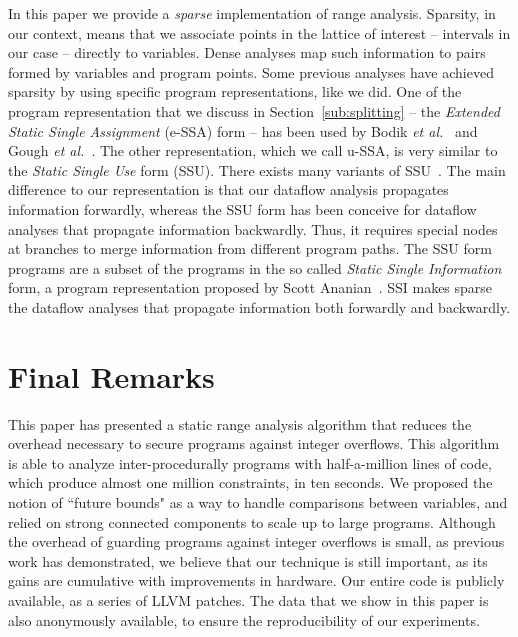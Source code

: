 \documentclass[preprint]{sigplanconf}[10pt]
\begin{document}
In this paper we provide a {\em sparse} implementation of range analysis.
Sparsity, in our context, means that we associate points in the lattice of
interest -- intervals in our case -- directly to variables.
Dense analyses map such information to pairs formed by variables and program
points.
Some previous analyses have achieved sparsity by using specific program
representations, like we did.
One of the program representation that we discuss in
Section~\ref{sub:splitting} -- the {\em
Extended Static Single Assignment} (e-SSA) form -- has been used by Bodik
{\em et al.}~\cite{Bodik00} and Gough {\em et al.}~\cite{Gough94}.
The other representation, which we call u-SSA, is very similar to
the \emph{Static Single Use} form (SSU).
There exists many variants of SSU~\cite{Plevyak96,George03,Lo98}.
The main difference to our representation is that our dataflow analysis
propagates information forwardly, whereas the SSU form has been conceive for
dataflow analyses that propagate information backwardly.
Thus, it requires special nodes at branches to merge information from
different program paths.
The SSU form programs are a subset of the programs in the so called
{\em Static Single Information} form, a program representation proposed by
Scott Ananian~\cite{Ananian99}.
SSI makes sparse the dataflow analyses that propagate information both
forwardly and backwardly.

\section{Final Remarks}
\label{sec:rem}

This paper has presented a static range analysis algorithm that reduces
the overhead necessary to secure programs against integer overflows.
This algorithm is able to analyze inter-procedurally programs with
half-a-million lines of code, which produce almost one million constraints, in
ten seconds.
We proposed the notion of ``future bounds" as a way to handle comparisons
between variables, and relied on strong connected components to scale up to
large programs.
Although the overhead of guarding programs against integer overflows is small,
as previous work has demonstrated, we believe that our technique is still
important, as its gains are cumulative with improvements in hardware.
Our entire code is publicly available, as a series of LLVM patches.
The data that we show in this paper is also anonymously available, to ensure
the reproducibility of our experiments.



\end{document}
